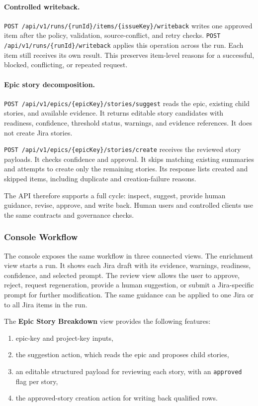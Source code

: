 \documentclass[manuscript,review]{acmart}
\begin{document}
\paragraph{Controlled writeback.}
\texttt{POST /api/v1/runs/\allowbreak\{runId\}/\allowbreak{}items/\allowbreak\{issueKey\}/\allowbreak{}writeback} writes one approved item after the policy, validation, source-conflict, and retry checks. \texttt{POST /api/v1/runs/\allowbreak\{runId\}/\allowbreak{}writeback} applies this operation across the run. Each item still receives its own result. This preserves item-level reasons for a successful, blocked, conflicting, or repeated request.

\paragraph{Epic story decomposition.}
\texttt{POST /api/v1/epics/\allowbreak\{epicKey\}/\allowbreak{}stories/\allowbreak{}suggest} reads the epic, existing child stories, and available evidence. It returns editable story candidates with readiness, confidence, threshold status, warnings, and evidence references. It does not create Jira stories.

\texttt{POST /api/v1/epics/\allowbreak\{epicKey\}/\allowbreak{}stories/\allowbreak{}create} receives the reviewed story payloads. It checks confidence and approval. It skips matching existing summaries and attempts to create only the remaining stories. Its response lists created and skipped items, including duplicate and creation-failure reasons.

The API therefore supports a full cycle: inspect, suggest, provide human guidance, revise, approve, and write back. Human users and controlled clients use the same contracts and governance checks.

\subsubsection{Console Workflow}
The console exposes the same workflow in three connected views. The enrichment view starts a run. It shows each Jira draft with its evidence, warnings, readiness, confidence, and selected prompt. The review view allows the user to approve, reject, request regeneration, provide a human suggestion, or submit a Jira-specific prompt for further modification. The same guidance can be applied to one Jira or to all Jira items in the run.

\begin{samepage}
The \textbf{Epic Story Breakdown} view provides the following features:
\begin{enumerate}
  \item epic-key and project-key inputs,
  \item the suggestion action, which reads the epic and proposes child stories,
  \item an editable structured payload for reviewing each story, with an \texttt{approved} flag per story,
  \item the approved-story creation action for writing back qualified rows.
\end{enumerate}
\end{samepage}
\end{document}
